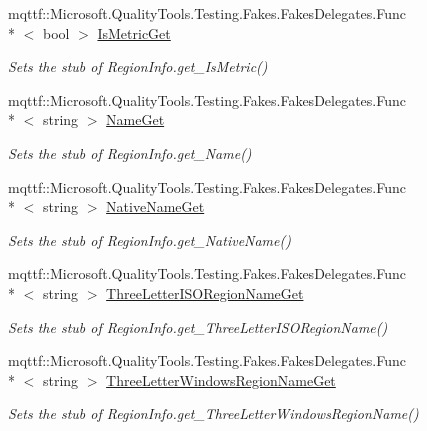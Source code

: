 \begin{DoxyCompactItemize}
mqttf\-::\-Microsoft.\-Quality\-Tools.\-Testing.\-Fakes.\-Fakes\-Delegates.\-Func\\*
$<$ bool $>$ \hyperlink{class_system_1_1_globalization_1_1_fakes_1_1_stub_region_info_ae8fadd795c275007b0d6323d8e17ada9}{Is\-Metric\-Get}
\begin{DoxyCompactList}\small\item\em Sets the stub of Region\-Info.\-get\-\_\-\-Is\-Metric()\end{DoxyCompactList}\item 
mqttf\-::\-Microsoft.\-Quality\-Tools.\-Testing.\-Fakes.\-Fakes\-Delegates.\-Func\\*
$<$ string $>$ \hyperlink{class_system_1_1_globalization_1_1_fakes_1_1_stub_region_info_a05367fe648f6f9f8c473ea79849ac7c1}{Name\-Get}
\begin{DoxyCompactList}\small\item\em Sets the stub of Region\-Info.\-get\-\_\-\-Name()\end{DoxyCompactList}\item 
mqttf\-::\-Microsoft.\-Quality\-Tools.\-Testing.\-Fakes.\-Fakes\-Delegates.\-Func\\*
$<$ string $>$ \hyperlink{class_system_1_1_globalization_1_1_fakes_1_1_stub_region_info_aff774b9f226cf797e43a036be1931ed7}{Native\-Name\-Get}
\begin{DoxyCompactList}\small\item\em Sets the stub of Region\-Info.\-get\-\_\-\-Native\-Name()\end{DoxyCompactList}\item 
mqttf\-::\-Microsoft.\-Quality\-Tools.\-Testing.\-Fakes.\-Fakes\-Delegates.\-Func\\*
$<$ string $>$ \hyperlink{class_system_1_1_globalization_1_1_fakes_1_1_stub_region_info_a923d5801ee1dac6ee240174a244f1880}{Three\-Letter\-I\-S\-O\-Region\-Name\-Get}
\begin{DoxyCompactList}\small\item\em Sets the stub of Region\-Info.\-get\-\_\-\-Three\-Letter\-I\-S\-O\-Region\-Name()\end{DoxyCompactList}\item 
mqttf\-::\-Microsoft.\-Quality\-Tools.\-Testing.\-Fakes.\-Fakes\-Delegates.\-Func\\*
$<$ string $>$ \hyperlink{class_system_1_1_globalization_1_1_fakes_1_1_stub_region_info_a2e69f10658377a338ed7e59cc18c9e0c}{Three\-Letter\-Windows\-Region\-Name\-Get}
\begin{DoxyCompactList}\small\item\em Sets the stub of Region\-Info.\-get\-\_\-\-Three\-Letter\-Windows\-Region\-Name()\end{DoxyCompactList}\item 

\end{DoxyCompactItemize}
